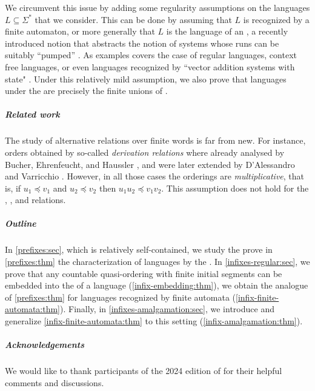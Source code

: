 We circumvent this issue by adding some regularity assumptions on the languages
$L \subseteq \Sigma^*$ that we consider. This can be done by assuming that $L$
is recognized by a finite automaton, or more generally that $L$ is the language
of an , a recently introduced notion that abstracts the
notion of systems whose runs can be suitably ``pumped'' \cite{ASZZ24}. As
examples  covers the case of regular languages,
context free languages, or even languages recognized by ``vector addition
systems with state" \cite{ASZZ24}. Under this relatively mild assumption, we
also prove that  languages under the 
are precisely the finite unions of .

\subparagraph{Related work} The study of alternative 
relations over finite words is far from new. For instance, orders obtained by
so-called \emph{derivation relations} where already analysed by Bucher,
Ehrenfeucht, and Haussler \cite{BUEUD85}, and were later extended by
D'Alessandro and Varricchio \cite{ALVA03,ALVA06}. However, in all those cases
the orderings are \emph{multiplicative}, that is, if $u_1 \preceq v_1$ and $u_2
\preceq v_2$ then $u_1u_2 \preceq v_1v_2$. This assumption does not hold for
the , , and  relations.

\subparagraph{Outline} In \cref{prefixes:sec}, which is relatively
self-contained, we study the  prove in \cref{prefixes:thm}
the characterization of  languages by the . In \cref{infixes-regular:sec}, we prove that any countable quasi-ordering
with finite initial segments can be embedded into the  of a
language (\cref{infix-embedding:thm}), we obtain the analogue of
\cref{prefixes:thm} for languages recognized by finite automata
(\cref{infix-finite-automata:thm}). Finally, in \cref{infixes-amalgamation:sec}, we
introduce  and generalize
\cref{infix-finite-automata:thm} to this setting
(\cref{infix-amalgamation:thm}).

\subparagraph{Acknowledgements} We would like to thank participants of the 2024
edition of  for their helpful comments and discussions.
